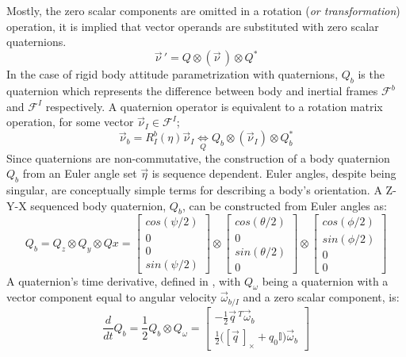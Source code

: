 Mostly, the zero scalar components are omitted in a rotation (\emph{or transformation}) operation, it is implied that vector operands are substituted with zero scalar quaternions.
\begin{equation}\label{eq:quaternion-rotation}
\vec{\nu}\hspace{2pt}'=Q \otimes (\vec{\nu}\hspace{2pt}) \otimes Q^*
\end{equation} 
In the case of rigid body attitude parametrization with quaternions, $Q_b$ is the quaternion which represents the difference between body and inertial frames $\mathcal{F}^b$ and $\mathcal{F}^I$ respectively. A quaternion operator is equivalent to a rotation matrix operation, for some vector $\vec{\nu}_I\in\mathcal{F}^I$;
\begin{equation}
\vec{\nu}_b=R_I^b(\eta)\vec{\nu}_I \underset{Q}{\iff} Q_b \otimes (\vec{\nu}_I) \otimes Q_b^*
\end{equation}
Since quaternions are non-commutative, the construction of a body quaternion $Q_b$ from an Euler angle set $\vec{\eta}$ is sequence dependent. Euler angles, despite being singular, are conceptually simple terms for describing a body's orientation. A Z-Y-X sequenced body quaternion, $Q_b$, can be constructed from Euler angles as:
\begin{equation}\label{eq:quaternion-sequence}
Q_b=Q_z\otimes Q_y\otimes Qx=\begin{bmatrix}
cos(\psi/2)\\
0\\
0\\
sin(\psi/2)
\end{bmatrix}
\otimes
\begin{bmatrix}
cos(\theta/2)\\
0\\
sin(\theta/2)\\
0
\end{bmatrix}
\otimes
\begin{bmatrix}
cos(\phi/2)\\
sin(\phi/2)\\
0\\
0
\end{bmatrix}
\end{equation}
A quaternion's time derivative, defined in \cite{quaterniondynamics}, with $Q_\omega$ being a quaternion with a vector component equal to angular velocity $\vec{\omega}_{b/I}$ and a zero scalar component, is:
\begin{equation}\label{eq:quaternion-deriv}
\frac{d}{dt}Q_b=\frac{1}{2}Q_b\otimes Q_{\omega}=\begin{bmatrix}
-\frac{1}{2}\vec{q}\hspace{2pt}^{T} \vec{\omega}_b\\
\frac{1}{2}\big([\vec{q}\hspace{2pt}]_\times+q_0\mathbb{I}\big)\vec{\omega}_b
\end{bmatrix}
\end{equation}
